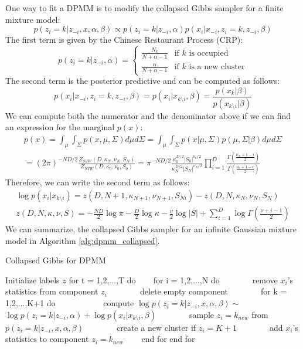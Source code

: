 One way to fit a DPMM is to modify the collapsed Gibbs sampler for a finite mixture model:
\begin{equation}
    p(z_i=k|z_{-i},x,\alpha,\beta) \propto p(z_i=k|z_{-i},\alpha)p(x_i|x_{-i},z_i=k,z_{-i},\beta)
\end{equation}
The first term is given by the Chinese Restaurant Process (CRP):
\begin{equation}
    p(z_i=k|z_{-i},\alpha) = 
    \begin{cases}
        \frac{N_k}{N+\alpha -1} & \text{if } k \text{ is occupied}\\
        \frac{\alpha}{N+\alpha-1} & \text{if } k \text{ is a new cluster}
    \end{cases}
\end{equation}
The second term is the posterior predictive and can be computed as follows:
\begin{equation}
    p(x_i|x_{-i},z_i=k,z_{-i},\beta) = p(x_i|x_{k\setminus i}, \beta) = \frac{p(x_{k}|\beta)}{p(x_{k\setminus i}|\beta)}
\end{equation}
We can compute both the numerator and the denominator above if we can find an expression for the marginal $p(x)$:
\begin{eqnarray}
    p(x) = \int_{\mu} \int_{\Sigma} p(x,\mu,\Sigma) d\mu d\Sigma = \int_{\mu} \int_{\Sigma} p(x|\mu,\Sigma)p(\mu,\Sigma|\beta)d\mu d\Sigma\\
    = (2\pi)^{-ND/2}\frac{Z_{NIW}(D,\kappa_N,\nu_N,S_N)}{Z_{NIW}(D,\kappa_0,\nu_0,S_0)} = \pi^{-ND/2}\frac{\kappa_{0}^{D/2}|S_0|^{\nu_0/2}}{\kappa_{N}^{D/2}|S_N|^{\nu_N/2}}\prod_{i=1}^{D}\frac{\Gamma(\frac{\nu_N+1-i}{2})}{\Gamma(\frac{\nu_0+1-i}{2})}
\end{eqnarray}
Therefore, we can write the second term as follows:
\begin{eqnarray}
    \log p(x_i|x_{k\setminus i}) = z(D,N+1,\kappa_{N+1},\nu_{N+1},S_{Ni}) - z(D,N,\kappa_{N},\nu_N,S_N)\\
    z(D,N,\kappa,\nu,S) = -\frac{ND}{2}\log \pi - \frac{D}{2}\log \kappa - \frac{\nu}{2}\log |S| + \sum_{i=1}^{D}\log \Gamma(\frac{\nu+i-1}{2})
\end{eqnarray}
We can summarize, the collapsed Gibbs sampler for an infinite Gaussian mixture model in Algorithm \ref{alg:dpmm_collapsed}.
\begin{algorithm}
\caption{Collapsed Gibbs for DPMM}
\label{alg:dpmm_collapsed}
\begin{algorithmic}[1]
\STATE Initialize labels $z$ 
\STATE for t = 1,2,...,T do 
\STATE ~~~ for i = 1,2,...,N do 
\STATE ~~~ ~~~ remove $x_i$'s statistics from component $z_i$ 
\STATE ~~~ ~~~ delete empty component
\STATE ~~~ ~~~ for k = 1,2,...,K+1 do
\STATE ~~~ ~~~ ~~~ compute $\log p(z_i=k|z_{-i},x,\alpha,\beta) \sim$
\STATE ~~~ ~~~ ~~~ $\log p(z_i = k|z_{-i},\alpha) + \log p(x_i|x_{k\setminus i},\beta)$
\STATE ~~~ ~~~ sample $z_i = k_{new}$ from $p(z_i=k|z_{-i},x,\alpha,\beta)$
\STATE ~~~ ~~~ create a new cluster if $z_i = K+1$
\STATE ~~~ ~~~ add $x_i$'s statistics to component $z_i = k_{new}$ 
\STATE ~~~ end for
\STATE end for
\end{algorithmic}
\end{algorithm}

